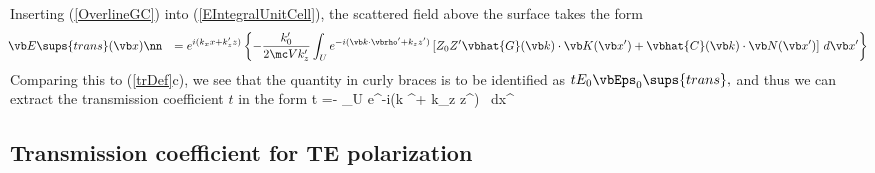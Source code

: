 \documentclass[letterpaper]{article}
\begin{document}
Inserting (\ref{OverlineGC}) into (\ref{EIntegralUnitCell}), 
the scattered field above the surface takes the form
\begin{align}
 &\hspace{-0.05in} \vb E\sups{trans}(\vb x)
\nn
&=
 e^{i(k_x x + k_z^\prime z)}
        \left\{ -\frac{k_0^\prime}{2\mc V k_z^\prime}
        \int_U e^{-i(\vb k \cdot \vbrho^\prime + k_z z^\prime)}
        \left[ Z_0 Z^\prime \vbhat{G}(\vb k)\cdot \vb K(\vb x^\prime)
                +\vbhat{C}(\vb k)\cdot \vb N(\vb x^\prime)
        \right] \, d\vb x^\prime
        \right\}
\label{ETransSurfaceIntegral}
\end{align}
Comparing this to (\ref{trDef}c), we see that the quantity in
curly braces is to be identified as $t E_0 \vbEps_0\sups{trans},$
and thus we can extract the transmission coefficient $t$ in the form
{
 t
 =-
   \int_U e^{-i(\vb k \cdot \vbrho^\prime + k_z z^\prime)}
         \, d\vb x^\prime
}

\subsection*{Transmission coefficient for TE polarization}
\end{document}
